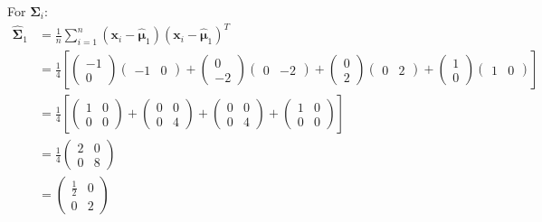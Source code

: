 \documentclass{homeworg}
\begin{document}
For $\bm{\Sigma}_i$:
\begin{equation}
    \begin{aligned}
        \bm{\hat{\Sigma}}_1 &= \frac{1}{n}\sum_{i=1}^n(\bm{x}_i - \bm{\hat{\mu}}_1)(\bm{x}_i - \bm{\hat{\mu}}_1)^T
        \\
        &=\frac{1}{4}\left[
            \begin{pmatrix}-1\\0\end{pmatrix}\begin{pmatrix} -1&0 \end{pmatrix} +
            \begin{pmatrix}0\\-2\end{pmatrix}\begin{pmatrix} 0&-2 \end{pmatrix} +
            \begin{pmatrix}0\\2\end{pmatrix}\begin{pmatrix} 0&2 \end{pmatrix} +
            \begin{pmatrix}1\\0\end{pmatrix}\begin{pmatrix} 1&0 \end{pmatrix}
        \right]
        \\
        &=\frac{1}{4}\left[
            \begin{pmatrix}1&0\\0&0\end{pmatrix} + 
            \begin{pmatrix}0&0\\0&4\end{pmatrix} + 
            \begin{pmatrix}0&0\\0&4\end{pmatrix} + 
            \begin{pmatrix}1&0\\0&0\end{pmatrix}
        \right]
        \\
        &=\frac{1}{4}\begin{pmatrix}2&0\\0&8\end{pmatrix}
        \\
        &=\begin{pmatrix}\frac{1}{2}&0\\0&2\end{pmatrix}
    \end{aligned}
\end{equation}
\end{document}
